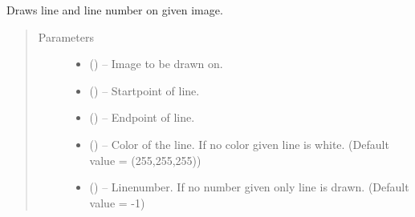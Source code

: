 \documentclass[letterpaper,10pt,english]{sphinxmanual}
\begin{document}
\begin{fulllineitems}
\label{\detokenize{image_helpers:image_helpers.draw_line}}
Draws line and line number on given image.
\begin{quote}\begin{description}
\item[{Parameters}] \leavevmode\begin{itemize}
\item {} 
 () -- Image to be drawn on.

\item {} 
 () -- Startpoint of line.

\item {} 
 () -- Endpoint of line.

\item {} 
 () -- Color of the line. If no color given line is white.
(Default value = (255,255,255))

\item {} 
 () -- Linenumber. If no number given only line is drawn.
(Default value = -1)

\end{itemize}

\end{description}\end{quote}

\end{fulllineitems}

\end{document}

